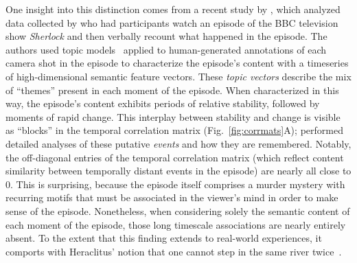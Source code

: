 \documentclass{article}
\begin{document}
One insight into this distinction comes from a recent study by \cite{HeusEtal18c}, which analyzed data collected by \cite{ChenEtal17} who had participants watch an episode of the BBC television show \textit{Sherlock} and then verbally recount what happened in the episode.  The authors used topic models~\citep{BleiEtal03} applied to human-generated annotations of each camera shot in the episode to characterize the episode's content with a timeseries of high-dimensional semantic feature vectors.  These \textit{topic vectors} describe the mix of ``themes'' present in each moment of the episode.  When characterized in this way, the episode's content exhibits periods of relative stability, followed by moments of rapid change. This interplay between stability and change is visible as ``blocks'' in the temporal correlation matrix (Fig.~\ref{fig:corrmats}A); \cite{HeusEtal18c} performed detailed analyses of these putative \textit{events} and how they are remembered.  Notably, the off-diagonal entries of the temporal correlation matrix (which reflect content similarity between temporally distant events in the episode) are nearly all close to 0.  This is surprising, because the episode itself comprises a murder mystery with recurring motifs that must be associated in the viewer's mind in order to make sense of the episode.  Nonetheless, when considering solely the semantic content of each moment of the episode, those long timescale associations are nearly entirely absent.  To the extent that this finding extends to real-world experiences, it comports with Heraclitus' notion that one cannot step in the same river twice~\citep{Hera}.
\end{document}
